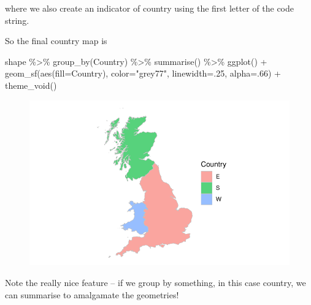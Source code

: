 \documentclass[
  letterpaper,
]{book}
\newenvironment{Shaded}{\begin{snugshade}}{\end{snugshade}}
\newcommand{\AttributeTok}[1]{\textcolor[rgb]{0.40,0.45,0.13}{#1}}
\newcommand{\DecValTok}[1]{\textcolor[rgb]{0.68,0.00,0.00}{#1}}
\newcommand{\FunctionTok}[1]{\textcolor[rgb]{0.28,0.35,0.67}{#1}}
\newcommand{\NormalTok}[1]{\textcolor[rgb]{0.00,0.23,0.31}{#1}}
\newcommand{\SpecialCharTok}[1]{\textcolor[rgb]{0.37,0.37,0.37}{#1}}
\newcommand{\StringTok}[1]{\textcolor[rgb]{0.13,0.47,0.30}{#1}}
\begin{document}
where we also create an indicator of country using the first letter of
the code string.

So the final country map is

\begin{Shaded}
\begin{Highlighting}[]
\NormalTok{shape }\SpecialCharTok{\%\textgreater{}\%}
  \FunctionTok{group\_by}\NormalTok{(Country) }\SpecialCharTok{\%\textgreater{}\%}
  \FunctionTok{summarise}\NormalTok{() }\SpecialCharTok{\%\textgreater{}\%}
  \FunctionTok{ggplot}\NormalTok{() }\SpecialCharTok{+}
  \FunctionTok{geom\_sf}\NormalTok{(}\FunctionTok{aes}\NormalTok{(}\AttributeTok{fill=}\NormalTok{Country), }\AttributeTok{color=}\StringTok{"grey77"}\NormalTok{, }\AttributeTok{linewidth=}\NormalTok{.}\DecValTok{25}\NormalTok{, }\AttributeTok{alpha=}\NormalTok{.}\DecValTok{66}\NormalTok{) }\SpecialCharTok{+}
  \FunctionTok{theme\_void}\NormalTok{()}
\end{Highlighting}
\end{Shaded}

\begin{figure}[H]

{\centering \includegraphics{Maps_files/figure-pdf/map0d-1.pdf}

}

\end{figure}

\begin{tcolorbox}[enhanced jigsaw, breakable, left=2mm, arc=.35mm, toptitle=1mm, colbacktitle=quarto-callout-tip-color!10!white, opacityback=0, bottomrule=.15mm, leftrule=.75mm, opacitybacktitle=0.6, title=\textcolor{quarto-callout-tip-color}{\faLightbulb}\hspace{0.5em}{\texttt{group} and \texttt{summarise} can join geographical areas}, colframe=quarto-callout-tip-color-frame, coltitle=black, titlerule=0mm, toprule=.15mm, bottomtitle=1mm, rightrule=.15mm, colback=white]

Note the really nice feature -- if we group by something, in this case
country, we can summarise to amalgamate the geometries!

\end{tcolorbox}
\end{document}
